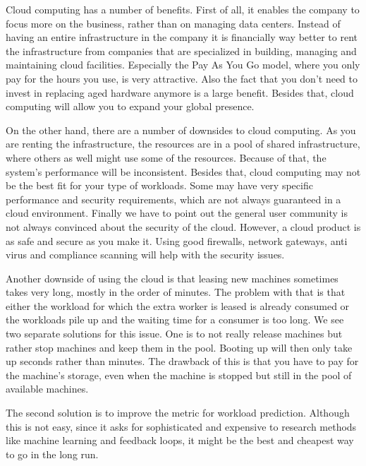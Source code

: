 \documentclass{stylesheet}
\begin{document}
Cloud computing has a number of benefits. First of all, it enables the company to focus more on the business, rather than on managing data centers. Instead of having an entire infrastructure in the company it is financially way better to rent the infrastructure from companies that are specialized in building, managing and maintaining cloud facilities. Especially the Pay As You Go model, where you only pay for the hours you use, is very attractive. Also the fact that you don't need to invest in replacing aged hardware anymore is a large benefit. Besides that, cloud computing will allow you to expand your global presence.

On the other hand, there are a number of downsides to cloud computing. As you are renting the infrastructure, the resources are in a pool of shared infrastructure, where others as well might use some of the resources. Because of that, the system's performance will be inconsistent. Besides that, cloud computing may not be the best fit for your type of workloads. Some may have very specific performance and security requirements, which are not always guaranteed in a cloud environment. Finally we have to point out the general user community is not always convinced about the security of the cloud. However, a cloud product is as safe and secure as you make it. Using good firewalls, network gateways, anti virus and compliance scanning will help with the security issues.

Another downside of using the cloud is that leasing new machines sometimes takes very long, mostly in the order of minutes. The problem with that is that either the workload for which the extra worker is leased is already consumed or the workloads pile up and the waiting time for a consumer is too long. We see two separate solutions for this issue. One is to not really release machines but rather stop machines and keep them in the pool. Booting up will then only take up seconds rather than minutes. The drawback of this is that you have to pay for the machine's storage, even when the machine is stopped but still in the pool of available machines.

The second solution is to improve the metric for workload prediction. Although this is not easy, since it asks for sophisticated and expensive to research methods like machine learning and feedback loops, it might be the best and cheapest way to go in the long run.


\end{document}
